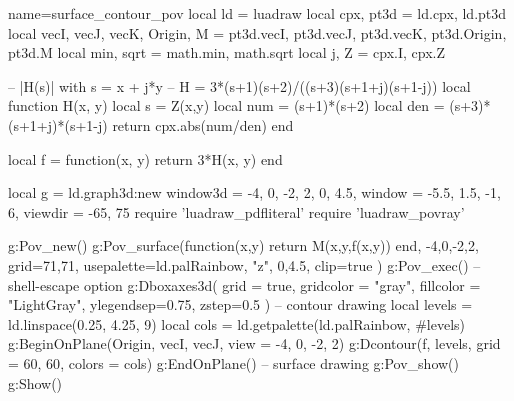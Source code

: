 \documentclass[border=5pt, tikz]{standalone}
\begin{document}
\begin{luadraw}{name=surface_contour_pov}
local ld = luadraw
local cpx, pt3d = ld.cpx, ld.pt3d
local vecI, vecJ, vecK, Origin, M = pt3d.vecI, pt3d.vecJ, pt3d.vecK, pt3d.Origin, pt3d.M
local min, sqrt = math.min, math.sqrt
local j, Z = cpx.I, cpx.Z

-- |H(s)| with s = x + j*y
-- H = 3*(s+1)(s+2)/((s+3)(s+1+j)(s+1-j))
local function H(x, y)
    local s = Z(x,y)
    local num = (s+1)*(s+2)
    local den = (s+3)*(s+1+j)*(s+1-j)
    return cpx.abs(num/den)
end

local f = function(x, y) return 3*H(x, y) end

local g = ld.graph3d:new{
    window3d = {-4, 0, -2, 2, 0, 4.5},
    window = {-5.5, 1.5, -1, 6}, 
    viewdir = {-65, 75}
}
require 'luadraw_pdfliteral'
require 'luadraw_povray'

g:Pov_new()
g:Pov_surface(function(x,y) return M(x,y,f(x,y)) end, -4,0,-2,2, 
    {grid={71,71}, usepalette={ld.palRainbow, "z", {0,4.5}}, clip=true })
g:Pov_exec() --shell-escape option
g:Dboxaxes3d( {grid = true, gridcolor = "gray", fillcolor = "LightGray", ylegendsep=0.75, zstep=0.5} )
-- contour drawing
local levels = ld.linspace(0.25, 4.25, 9)
local cols = ld.getpalette(ld.palRainbow, #levels)
g:BeginOnPlane({Origin, vecI, vecJ}, {view = {-4, 0, -2, 2}})
    g:Dcontour(f, levels, {grid = {60, 60}, colors = cols})
g:EndOnPlane()
-- surface drawing
g:Pov_show()
g:Show()
\end{luadraw}
\end{document}
